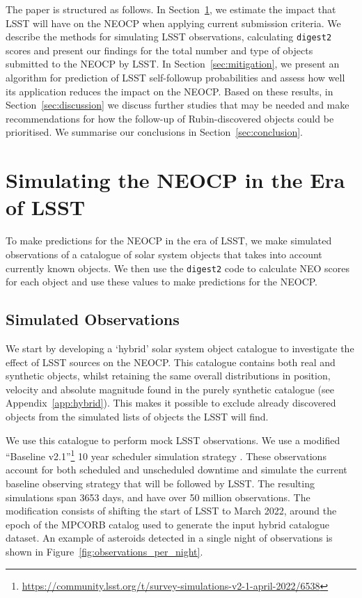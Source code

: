 \documentclass[twocolumn]{aastex631}
\newcommand{\dig}{\texttt{digest2}}
\begin{document}
The paper is structured as follows. In Section~\ref{sec:current_impact}, we estimate the impact that LSST will have on the NEOCP when applying current submission criteria. We describe the methods for simulating LSST observations, calculating \dig{} scores and present our findings for the total number and type of objects submitted to the NEOCP by LSST. In Section~\ref{sec:mitigation}, we present an algorithm for prediction of LSST self-followup probabilities and assess how well its application reduces the impact on the NEOCP. Based on these results, in Section~\ref{sec:discussion} we discuss further studies that may be needed and make recommendations for how the follow-up of Rubin-discovered objects could be prioritised. We summarise our conclusions in Section~\ref{sec:conclusion}.

\section{Simulating the NEOCP in the Era of LSST}\label{sec:current_impact}
To make predictions for the NEOCP in the era of LSST, we make simulated observations of a catalogue of solar system objects that takes into account currently known objects. We then use the \dig{} code to calculate NEO scores for each object and use these values to make predictions for the NEOCP.

\subsection{Simulated Observations}
We start by developing a `hybrid' solar system object catalogue to investigate the effect of LSST sources on the NEOCP. This catalogue contains both real and synthetic objects, whilst retaining the same overall distributions in position, velocity and absolute magnitude found in the purely synthetic catalogue (see Appendix~\ref{app:hybrid}). This makes it possible to exclude already discovered objects from the simulated lists of objects the LSST will find.

We use this catalogue to perform mock LSST observations. We use a modified ``Baseline v2.1''\footnote{\url{https://community.lsst.org/t/survey-simulations-v2-1-april-2022/6538}} 10 year scheduler simulation strategy \citep{Naghib+2019, Cornwall+2020}. These observations account for both scheduled and unscheduled downtime and simulate the current baseline observing strategy that will be followed by LSST. The resulting simulations span 3653 days, and have over 50 million observations. The modification consists of shifting the start of LSST to March 2022, around the epoch of the MPCORB catalog used to generate the input hybrid catalogue dataset. An example of asteroids detected in a single night of observations is shown in Figure~\ref{fig:observations_per_night}.
\end{document}
